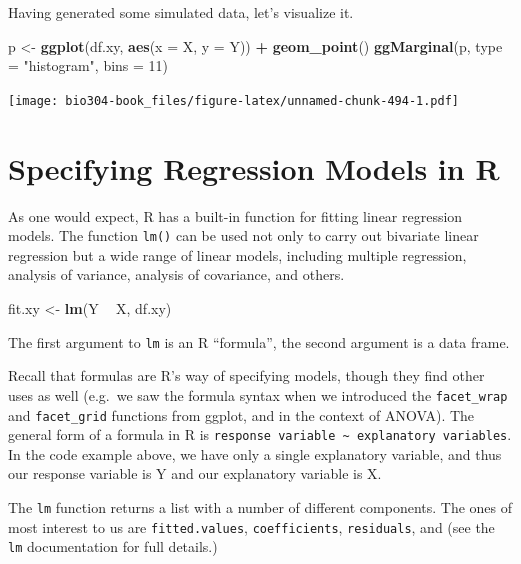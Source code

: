 \documentclass[]{book}
\newenvironment{Shaded}{\begin{snugshade}}{\end{snugshade}}
\newcommand{\DataTypeTok}[1]{\textcolor[rgb]{0.13,0.29,0.53}{#1}}
\newcommand{\DecValTok}[1]{\textcolor[rgb]{0.00,0.00,0.81}{#1}}
\newcommand{\KeywordTok}[1]{\textcolor[rgb]{0.13,0.29,0.53}{\textbf{#1}}}
\newcommand{\NormalTok}[1]{#1}
\newcommand{\OperatorTok}[1]{\textcolor[rgb]{0.81,0.36,0.00}{\textbf{#1}}}
\newcommand{\StringTok}[1]{\textcolor[rgb]{0.31,0.60,0.02}{#1}}
\theoremstyle{definition}
\theoremstyle{definition}
\theoremstyle{definition}
\theoremstyle{remark}
\begin{document}
Having generated some simulated data, let's visualize it.

\begin{Shaded}
\begin{Highlighting}[]
\NormalTok{p <-}\StringTok{ }\KeywordTok{ggplot}\NormalTok{(df.xy, }\KeywordTok{aes}\NormalTok{(}\DataTypeTok{x =}\NormalTok{ X, }\DataTypeTok{y =}\NormalTok{ Y)) }\OperatorTok{+}\StringTok{ }\KeywordTok{geom_point}\NormalTok{()}
\KeywordTok{ggMarginal}\NormalTok{(p, }\DataTypeTok{type =} \StringTok{"histogram"}\NormalTok{, }\DataTypeTok{bins =} \DecValTok{11}\NormalTok{)}
\end{Highlighting}
\end{Shaded}

\texttt{[image: bio304-book\_files/figure-latex/unnamed-chunk-494-1.pdf]}

\hypertarget{specifying-regression-models-in-r}{%
\section{Specifying Regression Models in
R}\label{specifying-regression-models-in-r}}

As one would expect, R has a built-in function for fitting linear
regression models. The function \texttt{lm()} can be used not only to
carry out bivariate linear regression but a wide range of linear models,
including multiple regression, analysis of variance, analysis of
covariance, and others.

\begin{Shaded}
\begin{Highlighting}[]
\NormalTok{fit.xy <-}\StringTok{ }\KeywordTok{lm}\NormalTok{(Y }\OperatorTok{~}\StringTok{ }\NormalTok{X, df.xy)}
\end{Highlighting}
\end{Shaded}

The first argument to \texttt{lm} is an R ``formula'', the second
argument is a data frame.

Recall that formulas are R's way of specifying models, though they find
other uses as well (e.g.~we saw the formula syntax when we introduced
the \texttt{facet\_wrap} and \texttt{facet\_grid} functions from ggplot,
and in the context of ANOVA). The general form of a formula in R is
\texttt{response\ variable\ \textasciitilde{}\ explanatory\ variables}.
In the code example above, we have only a single explanatory variable,
and thus our response variable is Y and our explanatory variable is X.

The \texttt{lm} function returns a list with a number of different
components. The ones of most interest to us are \texttt{fitted.values},
\texttt{coefficients}, \texttt{residuals}, and (see the \texttt{lm}
documentation for full details.)
\end{document}

